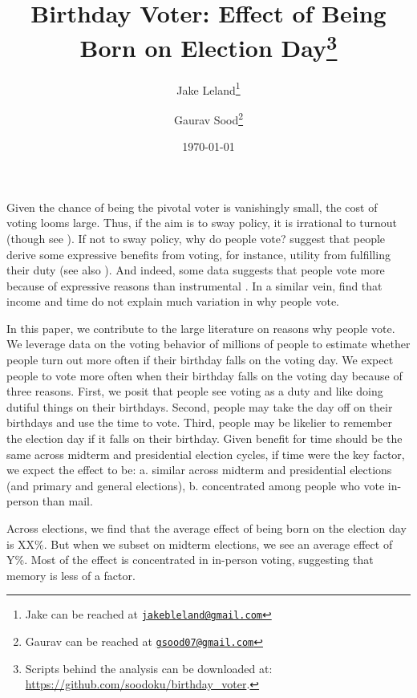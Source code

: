 \documentclass[12pt, letterpaper]{article}
\title{\Large{Birthday Voter: Effect of Being Born on Election Day}\footnote{Scripts behind the analysis can be downloaded at: \url{https://github.com/soodoku/birthday_voter}.}}
\author{Jake Leland\thanks{Jake can be reached at \href{mailto:jake.leland@utexas.edu}{\footnotesize{\texttt{jakebleland@gmail.com}}}}
\and Gaurav Sood\thanks{Gaurav can be reached at \href{mailto:gsood07@gmail.com}{\footnotesize{\texttt{gsood07@gmail.com}}}}}
\date{\vspace{.5cm}\normalsize{\today}}
\begin{document}
\maketitle

\begin{abstract}

\end{abstract}

\clearpage
\doublespacing
Given the chance of being the pivotal voter is vanishingly small, the cost of voting looms large. Thus, if the aim is to sway policy, it is irrational to turnout \citep{mclean1994condorcet, downs1957economic} (though see \citep{edlin2007voting}). If not to sway policy, why do people vote? \cite{riker1968theory} suggest that people derive some expressive benefits from voting, for instance, utility from fulfilling their duty (see also  \cite{fiorina1976voting}).  And indeed, some data suggests that people vote more because of expressive reasons than instrumental  \citep{kan2001expressive}. In a similar vein, \citep{verba1993citizen} find that income and time do not explain much variation in why people vote.

In this paper, we contribute to the large literature on reasons why people vote. We leverage data on the voting behavior of millions of people to estimate whether people turn out more often if their birthday falls on the voting day. We expect people to vote more often when their birthday falls on the voting day because of three reasons. First, we posit that people see voting as a duty and like doing dutiful things on their birthdays. Second, people may take the day off on their birthdays and use the time to vote. Third, people may be likelier to remember the election day if it falls on their birthday. Given benefit for time should be the same across midterm and presidential election cycles, if time were the key factor, we expect the effect to be: a. similar across midterm and presidential elections (and primary and general elections), b. concentrated among people who vote in-person than mail.
 
Across elections, we find that the average effect of being born on the election day is XX\%. But when we subset on midterm elections, we see an average effect of Y\%. Most of the effect is concentrated in in-person voting, suggesting that memory is less of a factor.
\end{document}
